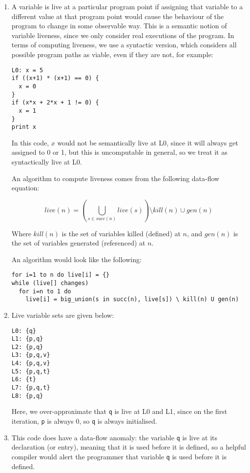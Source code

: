 


\begin{enumerate}[label=(\alph*)]

  \item
    A variable is live at a particular program point if assigning that variable to a different value at that program point would cause the behaviour of the program to change in some observable way. This is a semantic notion of variable liveness, since we only consider real executions of the program. In terms of computing liveness, we use a syntactic version, which considers all possible program paths as viable, even if they are not, for example:

\begin{verbatim}
L0: x = 5
if ((x+1) * (x+1) == 0) {
  x = 0
}
if (x*x + 2*x + 1 != 0) {
  x = 1
}
print x
\end{verbatim}

In this code, $x$ would not be semantically live at L0, since it will always get assigned to 0 or 1, but this is uncomputable in general, so we treat it as syntactically live at L0.

An algorithm to compute liveness comes from the following data-flow equation:

\[
  live(n) = \left(\bigcup_{s \in succ(n)} live(s)\right) \setminus kill(n) \cup gen(n)
\] 

Where $kill(n)$ is the set of variables killed (defined) at $n$, and $gen(n)$ is the set of variables generated (referenced) at $n$.

An algorithm would look like the following:

\begin{verbatim}
for i=1 to n do live[i] = {}
while (live[] changes)
  for i=n to 1 do
    live[i] = big_union(s in succ(n), live[s]) \ kill(n) U gen(n)
\end{verbatim}

\item
  Live variable sets are given below:
\begin{verbatim}
L0: {q}
L1: {p,q}
L2: {p,q}
L3: {p,q,v}
L4: {p,q,v}
L5: {p,q,t}
L6: {t}
L7: {p,q,t}
L8: {p,q}
\end{verbatim}

Here, we over-approximate that \texttt{q} is live at L0 and L1, since on the first iteration, \texttt{p} is always 0, so \texttt{q} is always initialised.

\item
  This code does have a data-flow anomaly: the variable \texttt{q} is live at its declaration (or entry), meaning that it is used before it is defined, so a helpful compiler would alert the programmer that variable \texttt{q} is used before it is defined.


\end{enumerate}
